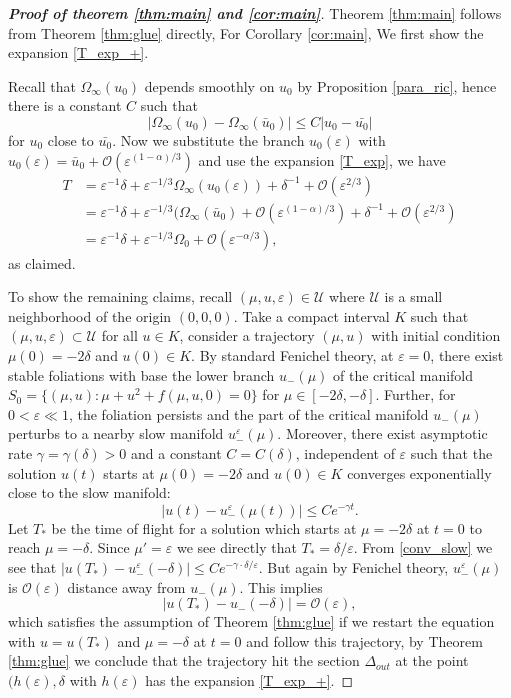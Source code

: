 \documentclass[letterpaper,11pt]{article}
\newcommand{\rmO}{\mathcal{O}}
\newcommand{\eps}{\varepsilon}
\numberwithin{equation}{section}
\theoremstyle{plain}
\begin{document}
\begin{proof}[\textbf{Proof of theorem \ref{thm:main} and \ref{cor:main}}]
Theorem \ref{thm:main} follows from Theorem \ref{thm:glue} directly, For Corollary \ref{cor:main}, We first show the expansion \eqref{T_exp_+}. 

Recall that $\Omega_\infty(u_0)$ depends smoothly on $u_0$ by Proposition \ref{para_ric}, hence there is a constant $C$ such that
\[
|\Omega_\infty(u_0) - \Omega_\infty(\bar{u}_0)| \le C|u_0 - \bar{u_0}|
\]
for $u_0$ close to $\bar{u_0}$. Now we substitute the branch $u_0(\eps)$ with $u_0(\eps)  =\bar{u}_0 + \rmO(\eps^{(1-\alpha)/3})$ and use the expansion \eqref{T_exp}, we have
\begin{align*}
T &= \eps^{-1}\delta + \eps^{-1/3}\Omega_\infty(u_0(\eps)) + \delta^{-1} + \rmO(\eps^{2/3})\\
&= \eps^{-1}\delta + \eps^{-1/3}(\Omega_\infty(\bar{u}_0) + \rmO(\eps^{(1-\alpha)/3})+\delta^{-1} + \rmO(\eps^{2/3}) \\
&= \eps^{-1}\delta + \eps^{-1/3}\Omega_0 + \rmO(\eps^{-\alpha/3}),
\end{align*}
as claimed.

To show the remaining claims, recall $(\mu,u,\eps) \in \mathcal{U}$ where $\mathcal{U}$ is a small neighborhood of the origin $(0,0,0)$. Take a compact interval $K$ such that $(\mu, u, \eps) \subset \mathcal{U}$ for all $u \in K$, consider a trajectory $(\mu, u)$ with initial condition $\mu(0) = -2\delta$ and $u(0) \in K$. By standard Fenichel theory, at $\eps = 0$, there exist stable foliations with base the lower branch $u_-(\mu)$ of  the critical manifold $S_0=\{ (\mu, u) : \mu+u^2 + f(\mu, u,0) =0 \}$ for $\mu \in [-2\delta, -\delta]$. Further, for $0<\eps \ll 1$, the foliation persists and the part of the critical manifold $u_-(\mu)$ perturbs to a nearby slow manifold $u_-^{\eps}(\mu)$. Moreover, there exist asymptotic rate $\gamma = \gamma(\delta)>0$ and a constant $C=C(\delta)$, independent of $\eps$ such that the solution $u(t)$ starts at $\mu(0)=-2\delta$ and $u(0) \in K$ converges exponentially close to the slow manifold:
\begin{equation}\label{conv_slow}
|u(t) - u_-^{\eps}(\mu(t))| \le Ce^{-\gamma t}.
\end{equation}
Let $T_*$ be the time of flight for a solution which starts at $\mu = -2\delta$ at $t=0$ to reach $\mu  = -\delta$. Since $\mu' = \eps$ we see directly that $T_* = \delta/\eps$. From \eqref{conv_slow} we see that $|u(T_*) - u_-^{\eps}(-\delta)| \le Ce^{-\gamma \cdot\delta/\eps}$. But again by Fenichel theory, $u_-^\eps(\mu)$ is $\rmO(\eps)$ distance away from $u_-(\mu)$. This implies
\[
|u(T_*) - u_-(-\delta) |  = \rmO(\eps),
\]
which satisfies the assumption of Theorem \ref{thm:glue} if we restart the equation with $u=u(T_*)$ and $\mu = -\delta$ at $t = 0$ and follow this trajectory, by Theorem \ref{thm:glue} we conclude that the trajectory hit the section $\Delta_{out}$ at the point $(h(\eps), \delta$ with $h(\eps)$ has the expansion \eqref{T_exp_+}.


\end{proof}
\end{document}
